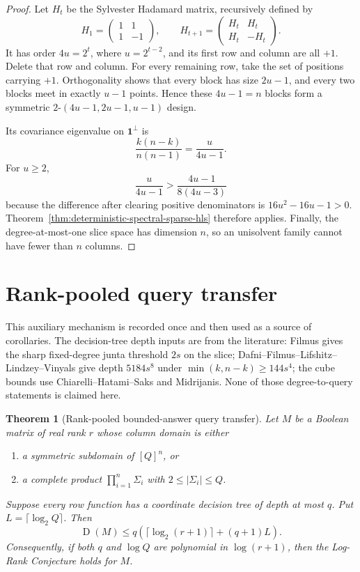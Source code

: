 \documentclass[11pt]{article}
\newtheorem{theorem}{Theorem}[section]
\theoremstyle{definition}
\theoremstyle{remark}
\newcommand{\1}{\mathbf 1}
\newcommand{\Dcc}{\operatorname{D}}
\begin{document}
\begin{proof}
Let \(H_t\) be the Sylvester Hadamard matrix, recursively defined by
\[
 H_1=\begin{pmatrix}1&1\\1&-1\end{pmatrix},
 \qquad
 H_{t+1}=\begin{pmatrix}H_t&H_t\\H_t&-H_t\end{pmatrix}.
\]
It has order \(4u=2^t\), where \(u=2^{t-2}\), and its first row and column are
all \(+1\).  Delete that row and column.  For every remaining row, take the
set of positions carrying \(+1\).  Orthogonality shows that every block has
size \(2u-1\), and every two blocks meet in exactly \(u-1\) points.  Hence
these \(4u-1=n\) blocks form a symmetric
\(2\)-\((4u-1,2u-1,u-1)\) design.

Its covariance eigenvalue on \(\mathbf1^\perp\) is
\[
 \frac{k(n-k)}{n(n-1)}=\frac{u}{4u-1}.
\]
For \(u\ge2\),
\[
 \frac{u}{4u-1}>\frac{4u-1}{8(4u-3)}
\]
because the difference after clearing positive denominators is
\(16u^2-16u-1>0\).  Theorem~\ref{thm:deterministic-spectral-sparse-hls}
therefore applies.  Finally, the degree-at-most-one slice space has dimension
\(n\), so an unisolvent family cannot have fewer than \(n\) columns.
\end{proof}


\section{Rank-pooled query transfer}

This auxiliary mechanism is recorded once and then used as a source of
corollaries.  The decision-tree depth inputs are from the literature:
Filmus gives the sharp fixed-degree junta threshold $2s$ on the slice;
Dafni--Filmus--Lifshitz--Lindzey--Vinyals give depth
$5184s^8$ under $\min(k,n-k)\ge144s^4$; the cube bounds use
Chiarelli--Hatami--Saks and Midrijanis.  None of those degree-to-query
statements is claimed here.

\begin{theorem}[Rank-pooled bounded-answer query transfer]
\label{thm:rank-pooled-query}
Let $M$ be a Boolean matrix of real rank $r$ whose column domain is either
\begin{enumerate}
\item a symmetric subdomain of $[Q]^n$, or
\item a complete product $\prod_{i=1}^n\Sigma_i$ with
      $2\le|\Sigma_i|\le Q$.
\end{enumerate}
Suppose every row function has a coordinate decision tree of depth at most
$q$.  Put $L=\lceil\log_2Q\rceil$.  Then
\[
 \Dcc(M)\le
 q\left(\lceil\log_2(r+1)\rceil+(q+1)L\right).
\]
Consequently, if both $q$ and $\log Q$ are polynomial in
$\log(r+1)$, then the Log-Rank Conjecture holds for $M$.
\end{theorem}
\end{document}

